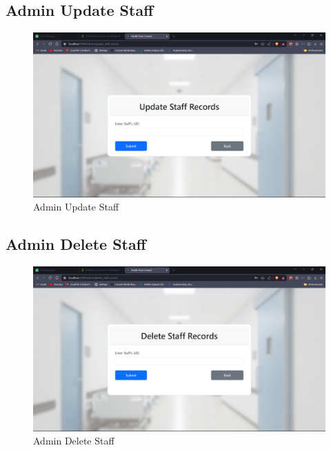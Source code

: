 \subsection{Admin Update Staff}
\begin{figure}[h!]
    \centering
    \includegraphics[width=\textwidth]{Admin_Update_Staff.png}
    \caption{Admin Update Staff}
\end{figure}
\subsection{Admin Delete Staff}
\begin{figure}[h!]
    \centering
    \includegraphics[width=\textwidth]{Admin_delete_staff.png}
    \caption{Admin Delete Staff}
\end{figure}

\clearpage
